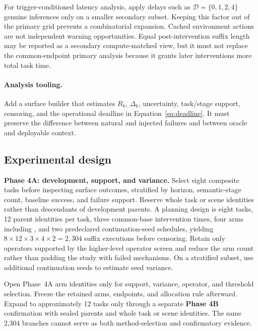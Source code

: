 For trigger-conditioned latency analysis, apply delays such as $\mathcal{D}=\{0,1,2,4\}$ genuine inferences only on a smaller secondary subset. Keeping this factor out of the primary grid prevents a combinatorial expansion. Cached environment actions are not independent warning opportunities. Equal post-intervention suffix length may be reported as a secondary compute-matched view, but it must not replace the common-endpoint primary analysis because it grants later interventions more total task time.

\paragraph{Analysis tooling.}
Add a surface builder that estimates $R_k$, $\Delta_k$, uncertainty, task/stage support, censoring, and the operational deadline in Equation~\eqref{eq:deadline}. It must preserve the difference between natural and injected failures and between oracle and deployable context.


\subsection{Experimental design}

\textbf{Phase 4A: development, support, and variance.} Select eight composite tasks before inspecting surface outcomes, stratified by horizon, semantic-stage count, baseline success, and failure support. Reserve whole task or scene identities rather than descendants of development parents. A planning design is eight tasks, 12 parent identities per task, three common-base intervention times, four arms including , and two predeclared continuation-seed schedules, yielding $8\times12\times3\times4\times2=2{,}304$ suffix executions before censoring. Retain only operators supported by the higher-level operator screen and reduce the arm count rather than padding the study with failed mechanisms. On a stratified subset, use additional continuation seeds to estimate seed variance.

Open Phase~4A arm identities only for support, variance, operator, and threshold selection. Freeze the retained arms, endpoints, and allocation rule afterward. Expand to approximately 12 tasks only through a separate \textbf{Phase 4B} confirmation with sealed parents and whole task or scene identities. The same 2,304 branches cannot serve as both method-selection and confirmatory evidence.


